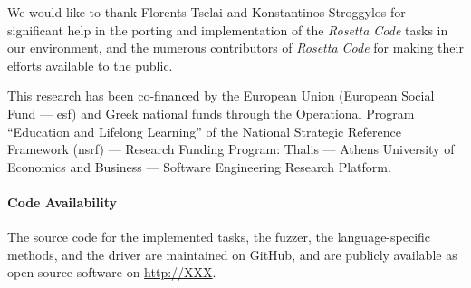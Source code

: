 \documentclass[10pt]{sigplanconf}
\begin{document}
\acks

We would like to thank Florents Tselai and Konstantinos Stroggylos 
for significant help in the porting and implementation of the
{\em Rosetta Code} tasks in our environment,
and the numerous contributors of {\em Rosetta Code} for
making their efforts available to the public.

This research has been co-financed by
the European Union (European Social Fund --- {\sc esf})
and Greek national funds through the Operational Program
``Education and Lifelong Learning''
of the National Strategic Reference Framework ({\sc nsrf})
--- Research Funding Program:
Thalis ---
Athens University of Economics and Business ---
Software Engineering Research Platform.

\paragraph{Code Availability} The source code for
the implemented tasks,
the fuzzer,
the language-specific methods, and
the driver are maintained on GitHub, and
are publicly available as open source software on \url{http://XXX}.









\end{document}
